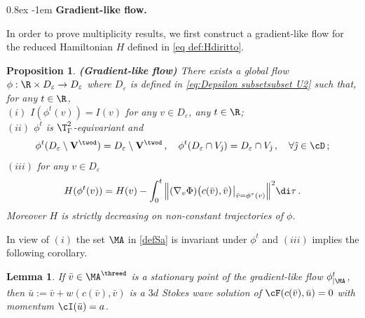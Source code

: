\documentclass[11pt,a4paper,reqno]{article}
\makeatletter
\renewcommand{\paragraph}{%
  \@startsection{paragraph}{4}{\z@}%
  {0.8ex}  %
  {-1em}   %
  {\normalfont\bfseries}%
}
\numberwithin{equation}{section}
\newtheorem{proposition}[theorem]{Proposition}
\newtheorem{lemma}[theorem]{Lemma}
\theoremstyle{definition}
\makeatother
\begin{document}
\paragraph{\bf Gradient-like flow.} 

In order to prove multiplicity results, 
we first construct a 
 gradient-like flow for the  
reduced Hamiltonian $H $ defined in \eqref{eq def:Hdiritto}.


\begin{proposition}\label{A flow}
{\bf (Gradient-like flow)}
There exists a global flow $ \phi :\R\times D_{\varepsilon}\to D_{\varepsilon} $ where  $D_{\varepsilon}$ is defined in \eqref{eq:Depsilon subsetsubset U2}  
such that, for any $ t\in \R $,  
\\[1mm]
$(i)$
  $  I( \phi^t(v)) = I(v) $ for
any $ v\in D_{\varepsilon} $, any $ t \in \R $;
\\[1mm]
$(ii)$ 
$ \phi^t$ is $\T^2_\Gamma $-equivariant and
\begin{equation}\label{eq:Ftv}
    \phi^t(  D_{\varepsilon}\setminus {\bf V}^{\twod} ) = D_{\varepsilon}\setminus {\bf V}^{\twod} \, , \quad \phi^t( D_{\varepsilon}\cap V_{\hat \jmath})=
    D_{\varepsilon}\cap V_{\hat \jmath} \, , \quad 
    \forall {\hat \jmath} \in \cD\, ;
\end{equation}
$(iii)$
for any $v\in D_{\varepsilon} $
            \begin{equation}\label{H-HFt}
                H(\phi^t(v))=H(v)-\int_0^t \Big\|(\nabla_v\Phi)
                \big(c(\bar v),\bar v \big)\big|_{\bar v=\phi^\tau (v)}\Big\|^2\di \tau \, .
            \end{equation}
            Moreover $H$ is strictly decreasing on non-constant trajectories of $\phi$. 
\end{proposition}

In view of $ (i) $ the set $ \MA $ in \eqref{defSa} is   invariant under $ \phi^t $ and $(iii)$ implies the following corollary.  

\begin{lemma}\label{lem:cor}
If $ \bar v \in \MA^{\threed} $ 
is a stationary point  of the gradient-like flow  $ \phi^t_{|\MA} $,   
    then $ \bar u:= \bar v+w(c( \bar v), \bar v)$ is a $3d$ Stokes wave solution of $\cF(c( \bar v), \bar u)=0$ with momentum $ \cI (\bar u) = a $.
\end{lemma}
\end{document}

